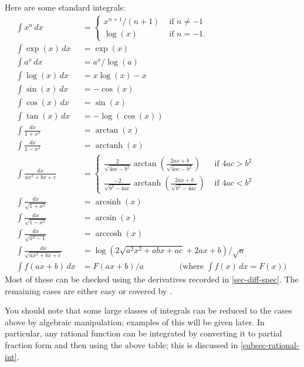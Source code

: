 \documentclass[a4paper]{book}
\newcommand{\arcsinh}  {\operatorname{arcsinh}}
\newcommand{\arccosh}  {\operatorname{arccosh}}
\newcommand{\arctanh}  {\operatorname{arctanh}}
\renewcommand{\:}{\colon}
\theoremstyle{definition}
\begin{document}
Here are some standard integrals:
\begin{align*}
 \int x^n\, dx       &= 
  \begin{cases} x^{n+1}/(n+1) & \text{ if } n\neq -1 \\
                \log(x)       & \text{ if } n = -1.
  \end{cases} \\
 \int \exp(x)\,dx  &= \exp(x) \\
 \int a^x\, dx     &= a^x/\log(a) \\
 \int \log(x)\,dx  &= x\log(x) - x \\
 \int \sin(x)\, dx &= -\cos(x) \\
 \int \cos(x)\, dx &= \sin(x) \\
 \int \tan(x)\, dx &= -\log(\cos(x)) \\
 \int \frac{dx}{1+x^2} &= \arctan(x) \\
 \int \frac{dx}{1-x^2} &= \arctanh(x) \\
 \int \frac{dx}{ax^2+bx+c} &= 
  \begin{cases} \frac{2}{\sqrt{4ac-b^2}}
                \arctan\left(\frac{2ax+b}{\sqrt{4ac-b^2}}\right) &
                 \text{ if } 4ac > b^2 \\
                \frac{-2}{\sqrt{b^2-4ac}}
                \arctanh\left(\frac{2ax+b}{\sqrt{b^2-4ac}}\right) &
                 \text{ if } 4ac < b^2
  \end{cases} \\
 \int \frac{dx}{\sqrt{1+x^2}} &= \arcsinh(x) \\
 \int \frac{dx}{\sqrt{1-x^2}} &= \arcsin(x) \\
 \int \frac{dx}{\sqrt{x^2-1}} &= \arccosh(x) \\
 \int \frac{dx}{\sqrt{ax^2+bx+c}} &=
  \log(2\sqrt{a^2x^2+abx+ac}+2ax+b)/\sqrt{a} \\
 \int f(ax+b)\, dx &= F(ax+b)/a 
                      \hspace{4em}
                      \text{ (where $\int f(x)\,dx=F(x)$) }
\end{align*}
Most of these can be checked using the derivatives recorded in
\autoref{sec-diff-spec}.  The remaining cases are either easy
or covered by .

You should note that some large classes of integrals can be reduced to
the cases above by algebraic manipulation; examples of this will be
given later.  In particular, any rational function can be integrated
by converting it to partial fraction form and then using the above
table; this is discussed in \autoref{subsec-rational-int}.
\end{document}
